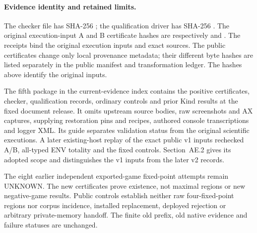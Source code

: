 \paragraph{Evidence identity and retained limits.}
The checker file  has SHA-256
;
the qualification driver  has SHA-256
.
The original execution-input A and B certificate hashes are respectively
and
.
The receipts bind the original execution inputs and exact sources.
The public certificates change only local provenance metadata; their
different byte hashes are listed separately in the public manifest and
transformation ledger. The hashes above identify the original inputs.

The fifth package in the current-evidence index contains the positive
certificates, checker, qualification records, ordinary controls and prior
Kind results at the fixed document release. It omits upstream source bodies,
raw screenshots and AX captures, supplying restoration pins and recipes,
authored console transcriptions and logger XML. Its guide separates
validation status from the original scientific executions. A later
existing-host replay of the exact public v1 inputs rechecked A/B,
all-typed ENV totality and the fixed controls. Section~AE.2 gives its
adopted scope and distinguishes the v1 inputs from the later v2 records.

The eight earlier independent exported-game fixed-point attempts remain
UNKNOWN. The new certificates prove existence, not maximal regions or
new negative-game results. Public controls establish neither raw
four-fixed-point regions nor corpus incidence, installed replacement,
deployed rejection or arbitrary private-memory handoff. The finite old
prefix, old native evidence and failure statuses are unchanged.
